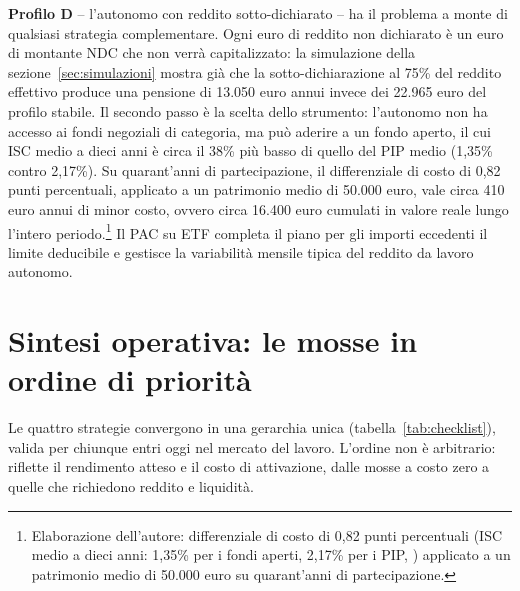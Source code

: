 \medskip
\noindent
\textbf{Profilo D} -- l'autonomo con reddito sotto-dichiarato -- ha
il problema a monte di qualsiasi strategia complementare. Ogni euro
di reddito non dichiarato è un euro di montante NDC che non verrà
capitalizzato: la simulazione della sezione~\ref{sec:simulazioni}
mostra già che la sotto-dichiarazione al 75\% del reddito effettivo
produce una pensione di 13.050 euro annui invece dei 22.965 euro
del profilo stabile. Il secondo passo è la scelta dello strumento:
l'autonomo non ha accesso ai fondi negoziali di categoria, ma può
aderire a un fondo aperto, il cui ISC medio a dieci anni è circa il 38\%
più basso di quello del PIP medio (1,35\% contro 2,17\%). Su quarant'anni
di partecipazione, il differenziale di costo di 0,82 punti percentuali,
applicato a un patrimonio medio di 50.000 euro, vale circa 410 euro
annui di minor costo, ovvero circa 16.400 euro cumulati in valore reale
lungo l'intero periodo.\footnote{Elaborazione dell'autore: differenziale
di costo di 0,82 punti percentuali (ISC medio a dieci anni: 1,35\% per i
fondi aperti, 2,17\% per i PIP, \citealp{COVIP2024}) applicato a un
patrimonio medio di 50.000 euro su quarant'anni di partecipazione.} Il PAC su ETF completa il piano per gli
importi eccedenti il limite deducibile e gestisce la variabilità
mensile tipica del reddito da lavoro autonomo.

\section{Sintesi operativa: le mosse in ordine di priorità}
\label{sec:checklist}

\noindent
Le quattro strategie convergono in una gerarchia unica (tabella~\ref{tab:checklist}),
valida per chiunque entri oggi nel mercato del lavoro. L'ordine non è arbitrario: riflette il rendimento
atteso e il costo di attivazione, dalle mosse a costo zero a quelle che richiedono
reddito e liquidità.

